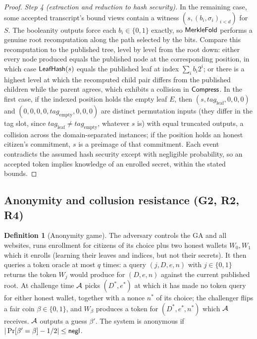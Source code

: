 \documentclass[11pt]{article}
\theoremstyle{definition}
\newtheorem{definitionx}{Definition}
\begin{document}
\begin{proof}
\emph{Step 4 (extraction and reduction to hash security).} In the remaining case, some
accepted transcript's bound views contain a witness $(s, (b_i, \sigma_i)_{i<d})$ for $S$.
The booleanity outputs force each $b_i \in \{0,1\}$ exactly, so $\mathsf{MerkleFold}$ performs a
genuine root recomputation along the path selected by the bits. Compare this recomputation
to the published tree, level by level from the root down: either every node produced
equals the published node at the corresponding position, in which case $\mathsf{LeafHash}(s)$
equals the published leaf at index $\sum_i b_i 2^i$; or there is a highest level at which
the recomputed child pair differs from the published children while the parent agrees,
which exhibits a collision in $\mathsf{Compress}$. In the first case, if the indexed position
holds the empty leaf $E$, then $(s, \mathit{tag}_{\mathrm{leaf}}, 0, 0, 0)$ and
$(0,0,0,0,\mathit{tag}_{\mathrm{empty}},0,0,0)$ are distinct permutation inputs (they
differ in the tag slot, since $\mathit{tag}_{\mathrm{leaf}} \ne
\mathit{tag}_{\mathrm{empty}}$, whatever $s$ is) with equal truncated outputs, a collision
across the domain-separated instances; if the position
holds an honest citizen's commitment, $s$ is a preimage of that commitment. Each event
contradicts the assumed hash security except with negligible probability, so an accepted
token implies knowledge of an enrolled secret, within the stated bounds.
\end{proof}

\subsection{Anonymity and collusion resistance (G2, R2, R4)}

\begin{definitionx}[Anonymity game]
The adversary controls the GA and all websites, runs enrollment for citizens of its choice
plus two honest wallets $W_0, W_1$ which it enrolls (learning their leaves and indices,
but not their secrets). It then queries a token oracle at most $q$ times: a query
$(j, D, e, n)$ with $j \in \{0,1\}$ returns the token $W_j$ would produce for $(D, e, n)$
against the current published root. At challenge time $\mathcal{A}$ picks $(D^*, e^*)$ at which
it has made no token query for either honest wallet, together with a nonce $n^*$ of its
choice; the challenger flips a fair coin $\beta \in \{0,1\}$, and $W_\beta$ produces a
token for $(D^*, e^*, n^*)$ which $\mathcal{A}$ receives. $\mathcal{A}$ outputs a guess $\beta'$. The
system is anonymous if $|\Pr[\beta' = \beta] - 1/2| \le \mathsf{negl}$.
\end{definitionx}
\end{document}
